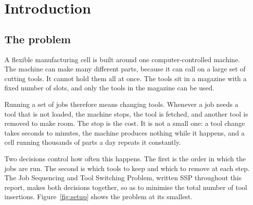 \section{Introduction}\label{sec:intro}

\subsection{The problem}\label{ssec:intro-problem}

A flexible manufacturing cell is built around one computer-controlled machine. The
machine can make many different parts, because it can call on a large set of
cutting tools. It cannot hold them all at once. The tools sit in a magazine with a
fixed number of slots, and only the tools in the magazine can be used.

Running a set of jobs therefore means changing tools. Whenever a job needs a tool
that is not loaded, the machine stops, the tool is fetched, and another tool is
removed to make room. The stop is the cost. It is not a small one: a tool change
takes seconds to minutes, the machine produces nothing while it happens, and a cell
running thousands of parts a day repeats it constantly.

Two decisions control how often this happens. The first is the order in which the
jobs are run. The second is which tools to keep and which to remove at each step.
The Job Sequencing and Tool Switching Problem, written SSP throughout this report,
makes both decisions together, so as to minimise the total number of tool
insertions. Figure~\ref{fig:setup} shows the problem at its smallest.

